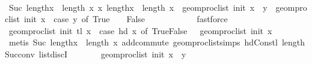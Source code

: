 \begin{isabellebody}
\ \ \ \ \ \ \isamarkupfalse%
\ {\isacartoucheopen}Suc\ lengthx\ {\isacharequal}{\kern0pt}\ length\ x{\isacartoucheclose}\ {\isacartoucheopen}{\isasymAnd}x{}{\isachardot}{\kern0pt}\ lengthx\ {\isacharequal}{\kern0pt}\ length\ x{}\ {\isasymLongrightarrow}\ geom{\isacharunderscore}{\kern0pt}proc{\isacharunderscore}{\kern0pt}list\ init\ {\isacharparenleft}{\kern0pt}x{}\ {\isacharat}{\kern0pt}\ {\isacharbrackleft}{\kern0pt}y{\isacharbrackright}{\kern0pt}{\isacharparenright}{\kern0pt}\ {\isacharequal}{\kern0pt}\ geom{\isacharunderscore}{\kern0pt}proc{\isacharunderscore}{\kern0pt}list\ init\ x{}\ {\isacharplus}{\kern0pt}\ {\isacharparenleft}{\kern0pt}case\ y\ of\ True\ {\isasymRightarrow}\ {}\ {\isacharbar}{\kern0pt}\ False\ {\isasymRightarrow}\ {\isacharminus}{\kern0pt}\ {}{\isacharparenright}{\kern0pt}{\isacartoucheclose}\ \isanewline
\ \ \ \ \ \ \isamarkupfalse%
\ fastforce\isanewline
\ \ \ \ \isamarkupfalse%
\ \isamarkupfalse%
\ {\isachardoublequoteopen}geom{\isacharunderscore}{\kern0pt}proc{\isacharunderscore}{\kern0pt}list\ init\ {\isacharparenleft}{\kern0pt}tl\ x{\isacharparenright}{\kern0pt}\ {\isacharplus}{\kern0pt}\ {\isacharparenleft}{\kern0pt}case\ hd\ x\ of\ True{\isasymRightarrow}{}{\isacharbar}{\kern0pt}False{\isasymRightarrow}\ {\isacharminus}{\kern0pt}{}{\isacharparenright}{\kern0pt}\ {\isacharequal}{\kern0pt}\ geom{\isacharunderscore}{\kern0pt}proc{\isacharunderscore}{\kern0pt}list\ init\ x{\isachardoublequoteclose}\isanewline
\ \ \ \ \ \ \isamarkupfalse%
\ {\isacharparenleft}{\kern0pt}metis\ {\isacartoucheopen}Suc\ lengthx\ {\isacharequal}{\kern0pt}\ length\ x{\isacartoucheclose}\ add{\isachardot}{\kern0pt}commute\ geom{\isacharunderscore}{\kern0pt}proc{\isacharunderscore}{\kern0pt}list{\isachardot}{\kern0pt}simps{\isacharparenleft}{\kern0pt}{}{\isacharparenright}{\kern0pt}\ hd{\isacharunderscore}{\kern0pt}Cons{\isacharunderscore}{\kern0pt}tl\ length{\isacharunderscore}{\kern0pt}Suc{\isacharunderscore}{\kern0pt}conv\ list{\isachardot}{\kern0pt}discI{\isacharparenright}{\kern0pt}\isanewline
\ \ \ \ \isamarkupfalse%
\ \isamarkupfalse%
\ {\isachardoublequoteopen}geom{\isacharunderscore}{\kern0pt}proc{\isacharunderscore}{\kern0pt}list\ init\ {\isacharparenleft}{\kern0pt}x\ {\isacharat}{\kern0pt}\ {\isacharbrackleft}{\kern0pt}y{\isacharbrackright}{\kern0pt}{\isacharparenright}{\kern0pt}\ {\isacharequal}{\kern0pt}\isanewline

\end{isabellebody}
